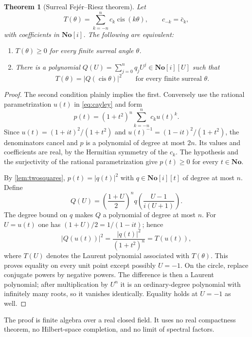 \documentclass[11pt]{article}
\numberwithin{equation}{section}
\newtheorem{theorem}{Theorem}[section]
\theoremstyle{definition}
\newcommand{\No}{\mathbf{No}}
\newcommand{\SC}{\mathbf{No}[i]}
\newcommand{\cis}{\operatorname{cis}}
\begin{document}
\begin{theorem}[Surreal Fej\'er--Riesz theorem]\label{thm:fejer}
Let
\[
 T(\theta)=\sum_{k=-n}^{n}c_k\cis(k\theta),\qquad
 c_{-k}=\bar c_k,
\]
with coefficients in $\SC$. The following are equivalent:
\begin{enumerate}
 \item $T(\theta)\ge0$ for every finite surreal angle $\theta$.
 \item There is a polynomial $Q(U)=\sum_{j=0}^nq_jU^j\in\SC[U]$ such that
 \begin{equation}\label{eq:fejer}
 T(\theta)=|Q(\cis\theta)|^2
 \qquad\text{for every finite surreal }\theta.
 \end{equation}
\end{enumerate}
\end{theorem}
\begin{proof}
The second condition plainly implies the first. Conversely use the rational parametrization $u(t)$ in \eqref{eq:cayley} and form
\begin{equation}\label{eq:cayleypositive}
 p(t)=(1+t^2)^n\sum_{k=-n}^{n}c_ku(t)^k.
\end{equation}
Since $u(t)=(1+it)^2/(1+t^2)$ and $u(t)^{-1}=(1-it)^2/(1+t^2)$, the denominators cancel and $p$ is a polynomial of degree at most $2n$. Its values and coefficients are real, by the Hermitian symmetry of the $c_k$. The hypothesis and the surjectivity of the rational parametrization give $p(t)\ge0$ for every $t\in\No$.

By \cref{lem:twosquares}, $p(t)=|q(t)|^2$ with $q\in\SC[t]$ of degree at most $n$. Define
\begin{equation}\label{eq:fejerconstruction}
 Q(U)=\left(\frac{1+U}{2}\right)^n
 q\left(\frac{U-1}{i(U+1)}\right).
\end{equation}
The degree bound on $q$ makes $Q$ a polynomial of degree at most $n$. For $U=u(t)$ one has $(1+U)/2=1/(1-it)$; hence
\[
 |Q(u(t))|^2=\frac{|q(t)|^2}{(1+t^2)^n}=T(u(t)),
\]
where $T(U)$ denotes the Laurent polynomial associated with $T(\theta)$. This proves equality on every unit point except possibly $U=-1$. On the circle, replace conjugate powers by negative powers. The difference is then a Laurent polynomial; after multiplication by $U^n$ it is an ordinary-degree polynomial with infinitely many roots, so it vanishes identically. Equality holds at $U=-1$ as well.
\end{proof}
The proof is finite algebra over a real closed field. It uses no real compactness theorem, no Hilbert-space completion, and no limit of spectral factors.
\end{document}
